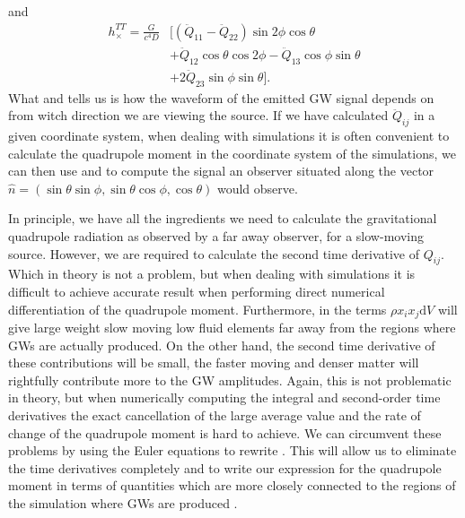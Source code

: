 and
\begin{align}
\label{eqT:hc}
h_{\times}^{TT} = \frac{G}{c^4 D} & \Big[ (\ddot{Q}_{11} - \ddot{Q}_{22}) \sin{2\phi}\cos{\theta}\\ \nonumber
& +\ddot{Q}_{12} \cos{\theta} \cos{2\phi} - \ddot{Q}_{13} \cos{\phi} \sin{\theta} \\ \nonumber
& +  2\ddot{Q}_{23} \sin{\phi} \sin{\theta} \Big]. 
\end{align}
What  and  tells us is how the waveform of the emitted GW signal depends on from witch direction we are viewing the source.
If we have calculated $\ddot{Q}_{ij}$ in a given coordinate system, when dealing with simulations it is often convenient to calculate the quadrupole moment
in the coordinate system of the simulations, we can then use  and  to compute the signal an observer situated along the
vector $\hat{n} = (\sin{\theta} \sin{\phi}, \sin{\theta} \cos{\phi},\cos{\theta})$ would observe.

In principle, we have all the ingredients we need to calculate the gravitational quadrupole radiation as observed by a far away observer, 
for a slow-moving source. However, we are required to calculate the second time derivative of $Q_{ij}$. Which in theory is not a problem, but
when dealing with simulations it is difficult to achieve accurate result when performing direct numerical differentiation of the
quadrupole moment. 
Furthermore, in  the terms $\rho x_i x_j \mathrm{d} V$ will give large weight
slow moving low fluid elements far away from the regions where GWs are actually produced. 
On the other hand, the second time derivative of these contributions
will be small, the faster moving and denser matter will rightfully contribute more to the GW amplitudes.  
Again, this is not problematic in theory, but when numerically computing the integral and second-order time derivatives 
the exact cancellation of the large average value and the rate of change of the quadrupole moment is hard to achieve.
We can circumvent these problems by using the Euler equations to rewrite . This will allow us to
eliminate the time derivatives completely and to write our expression for the quadrupole moment in terms of quantities 
which are more closely connected to the regions of the simulation where GWs are produced \citep{oohara_97,finn_89,blanchet_90}.

